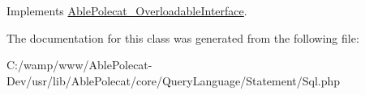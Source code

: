 Implements \hyperlink{interface_able_polecat___overloadable_interface_a94d2e558bba777f54dcc10f1bfc4dca5}{Able\+Polecat\+\_\+\+Overloadable\+Interface}.



The documentation for this class was generated from the following file\+:\begin{DoxyCompactItemize}
\item 
C\+:/wamp/www/\+Able\+Polecat-\/\+Dev/usr/lib/\+Able\+Polecat/core/\+Query\+Language/\+Statement/Sql.\+php\end{DoxyCompactItemize}

